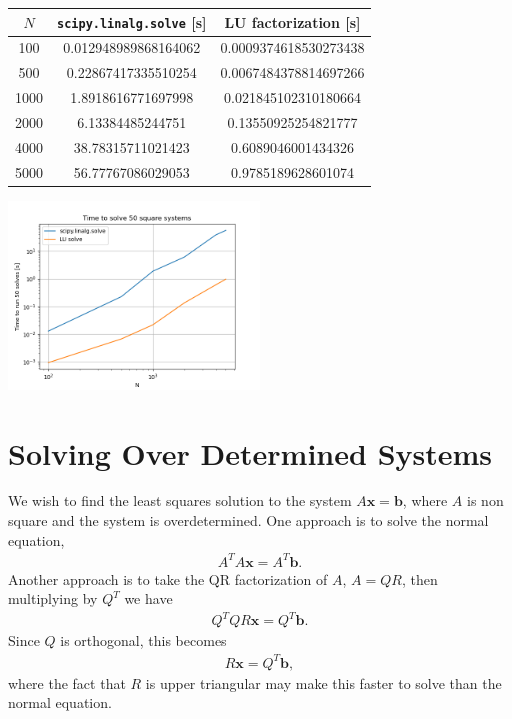 \documentclass[10pt]{article}
\renewcommand{\vec}{\textbf}
\begin{document}
\begin{center}
  \begin{tabular}{c|c | c}
   \(N\) & \texttt{scipy.linalg.solve} [s] & LU factorization [s] \\
   \hline 
   100 & 0.012948989868164062 & 0.0009374618530273438 \\
500 & 0.22867417335510254 & 0.0067484378814697266 \\
1000 & 1.8918616771697998 & 0.021845102310180664 \\
2000 & 6.13384485244751 & 0.13550925254821777 \\
4000 & 38.78315711021423 & 0.6089046001434326 \\
5000 & 56.77767086029053 & 0.9785189628601074 \\
  \end{tabular}
  \end{center}

\begin{center}
  \includegraphics[width=0.5\textwidth]{time.png}
\end{center}

\section{Solving Over Determined Systems}
We wish to find the least squares solution to the system \(A\vec{x} = \vec{b}\), where \(A\) is non square and the system is overdetermined. One approach is to solve the normal equation, \begin{align*}
    A^TA\vec{x} = A^T\vec{b}.
\end{align*} Another approach is to take the QR factorization of \(A\), \(A=QR\), then multiplying by \(Q^T\) we have \begin{align*}
    Q^TQR\vec{x} = Q^T\vec{b}.
\end{align*} Since \(Q\) is orthogonal, this becomes \begin{align*}
    R\vec{x} = Q^T\vec{b},
\end{align*} where the fact that \(R\) is upper triangular may make this faster to solve than the normal equation.
\end{document}
